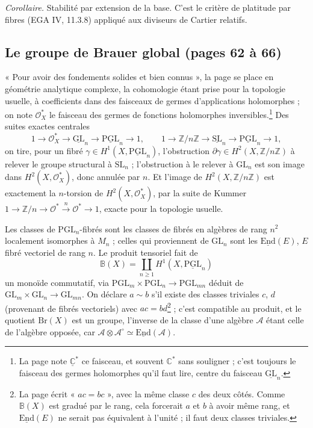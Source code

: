 \documentclass[11pt,a4paper]{article}
\begin{document}
\emph{Corollaire.} Stabilité par extension de la base. C'est le critère de
platitude par fibres (EGA IV, 11.3.8) appliqué aux diviseurs de Cartier
relatifs.

\subsection*{Le groupe de Brauer global (pages 62 à 66)}

« Pour avoir des fondements solides et bien connus », la page se place en
géométrie analytique complexe, la cohomologie étant prise pour la topologie
usuelle, à coefficients dans des faisceaux de germes d'applications
holomorphes ; on note $\mathcal{O}_X^{*}$ le faisceau des germes de fonctions
holomorphes inversibles.\footnote{La page note $\underline{\mathbb{C}}^{*}$ ce
faisceau, et souvent $\mathbb{C}^{*}$ sans souligner ; c'est toujours le
faisceau des germes holomorphes qu'il faut lire, centre du faisceau
$\underline{\mathrm{GL}}_n$.} Des suites exactes centrales
\[
1 \to \mathcal{O}_X^{*} \to \underline{\mathrm{GL}}_n \to
\underline{\mathrm{PGL}}_n \to 1, \qquad
1 \to \mathbb{Z}/n\mathbb{Z} \to \underline{\mathrm{SL}}_n \to
\underline{\mathrm{PGL}}_n \to 1,
\]
on tire, pour un fibré $\gamma \in H^1(X, \underline{\mathrm{PGL}}_n)$,
l'obstruction $\partial\gamma \in H^2(X, \mathbb{Z}/n\mathbb{Z})$ à relever le
groupe structural à $\mathrm{SL}_n$ ; l'obstruction à le relever à
$\mathrm{GL}_n$ est son image dans $H^2(X, \mathcal{O}_X^{*})$, donc annulée par
$n$. Et l'image de $H^2(X, \mathbb{Z}/n\mathbb{Z})$ est exactement la
$n$-torsion de $H^2(X, \mathcal{O}_X^{*})$, par la suite de Kummer $1 \to
\mathbb{Z}/n \to \mathcal{O}^{*} \xrightarrow{n} \mathcal{O}^{*} \to 1$, exacte
pour la topologie usuelle.

Les classes de $\mathrm{PGL}_n$-fibrés sont les classes de fibrés en algèbres
de rang $n^2$ localement isomorphes à $M_n$ ; celles qui proviennent de
$\mathrm{GL}_n$ sont les $\underline{\mathrm{End}}(E)$, $E$ fibré vectoriel de
rang $n$. Le produit tensoriel fait de
\[
\mathbb{B}(X) = \coprod_{n \ge 1} H^1(X, \underline{\mathrm{PGL}}_n)
\]
un monoïde commutatif, via $\mathrm{PGL}_m \times \mathrm{PGL}_n \to
\mathrm{PGL}_{mn}$ déduit de $\mathrm{GL}_m \times \mathrm{GL}_n \to
\mathrm{GL}_{mn}$. On déclare $a \sim b$ s'il existe des classes triviales $c$,
$d$ (provenant de fibrés vectoriels) avec $ac = bd$\footnote{La page écrit
« $ac = bc$ », avec la même classe $c$ des deux côtés. Comme $\mathbb{B}(X)$
est gradué par le rang, cela forcerait $a$ et $b$ à avoir même rang, et
$\underline{\mathrm{End}}(E)$ ne serait pas équivalent à l'unité ; il faut deux
classes triviales.} ; c'est compatible au produit, et le quotient
$\mathrm{Br}(X)$ est un groupe, l'inverse de la classe d'une algèbre
$\mathcal{A}$ étant celle de l'algèbre opposée, car $\mathcal{A} \otimes
\mathcal{A}^{\circ} \simeq \underline{\mathrm{End}}(\mathcal{A})$.
\end{document}
